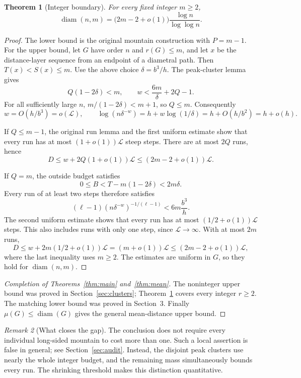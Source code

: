 \documentclass[11pt]{amsart}
\newtheorem{theorem}{Theorem}[section]
\theoremstyle{definition}
\theoremstyle{remark}
\newtheorem{remark}[theorem]{Remark}
\newcommand{\diam}{\operatorname{diam}}
\begin{document}
\begin{theorem}[Integer boundary]\label{thm:integer}
For every fixed integer $m\ge2$,
\[
 \diam(n,m)=\bigl(2m-2+o(1)\bigr)
             \frac{\log n}{\log\log n}.
\]
\end{theorem}

\begin{proof}
The lower bound is the original mountain construction with $P=m-1$.
For the upper bound, let $G$ have order $n$ and $r(G)\le m$, and let $x$
be the distance-layer sequence from an endpoint of a diametral path.
Then $T(x)<S(x)\le m$.  Use the above choice $\delta=b^3/h$.
The peak-cluster lemma gives
\[
 Q(1-2\delta)<m,
 \qquad
 w<\frac{6m}{\delta}+2Q-1.
\]
For all sufficiently large $n$, $m/(1-2\delta)<m+1$, so $Q\le m$.
Consequently
\[
 w=O(h/b^3)=o(\mathcal L),
 \qquad
 \log(n\delta^{-w})
 =h+w\log(1/\delta)
 =h+O(h/b^2)=h+o(h).
\]

If $Q\le m-1$, the original run lemma and the first uniform estimate
show that every run has at most $(1+o(1))\mathcal L$ steep steps.
There are at most $2Q$ runs, hence
\[
 D\le w+2Q(1+o(1))\mathcal L
 \le(2m-2+o(1))\mathcal L.
\]

If $Q=m$, the outside budget satisfies
\[
 0\le B<T-m(1-2\delta)<2m\delta.
\]
Every run of at least two steps therefore satisfies
\[
 (\ell-1)(n\delta^{-w})^{-1/(\ell-1)}<6m\frac{b^3}{h}.
\]
The second uniform estimate shows that every run has at most
$(1/2+o(1))\mathcal L$ steps.  This also includes runs with only one
step, since $\mathcal L\to\infty$.  With at most $2m$ runs,
\[
 D\le w+2m(1/2+o(1))\mathcal L
   =(m+o(1))\mathcal L
   \le(2m-2+o(1))\mathcal L,
\]
where the last inequality uses $m\ge2$.
The estimates are uniform in $G$, so they hold for $\diam(n,m)$.
\end{proof}


\begin{proof}[Completion of Theorems~\ref{thm:main} and~\ref{thm:mean}]
The noninteger upper bound was proved in Section~\ref{sec:clusters};
Theorem~\ref{thm:integer} covers every integer $r\ge2$. The matching
lower bound was proved in Section~3. Finally $\mu(G)\le\diam(G)$ gives
the general mean-distance upper bound.
\end{proof}

\begin{remark}[What closes the gap]
The conclusion does not require every individual long-sided mountain to
cost more than one. Such a local assertion is false in general; see
Section~\ref{sec:audit}. Instead, the disjoint peak clusters use nearly
the whole integer budget, and the remaining mass simultaneously bounds
every run. The shrinking threshold makes this distinction quantitative.
\end{remark}
\end{document}
